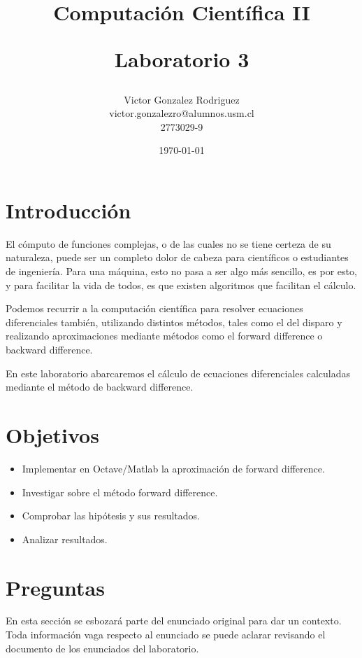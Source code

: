 \documentclass[12pt,letterpaper]{article}
\begin{document}
\title{Computación Científica II \\ \begin{Large}Laboratorio 3\end{Large}} 
\author{Victor Gonzalez Rodriguez\\victor.gonzalezro@alumnos.usm.cl\\2773029-9}
\date{\today}
\maketitle

\section{Introducción}
El cómputo de funciones complejas, o de las cuales no se tiene certeza de su naturaleza, puede ser un completo dolor de cabeza para científicos o estudiantes de ingeniería. Para una máquina, esto no pasa a ser algo más sencillo, es por esto, y para facilitar la vida de todos, es que existen algoritmos que facilitan el cálculo.

Podemos recurrir a la computación científica para resolver ecuaciones diferenciales también, utilizando distintos métodos, tales como el del disparo y realizando aproximaciones mediante métodos como el forward difference o backward difference.

En este laboratorio abarcaremos el cálculo de ecuaciones diferenciales calculadas mediante el método de backward difference.

\section{Objetivos}
\begin{itemize}
\item Implementar en Octave/Matlab la aproximación de forward difference.
\item Investigar sobre el método forward difference.
\item Comprobar las hipótesis y sus resultados.
\item Analizar resultados.
\end{itemize}

\section{Preguntas}
En esta sección se esbozará parte del enunciado original para dar un contexto. Toda información vaga respecto al enunciado se puede aclarar revisando el documento de los enunciados del laboratorio.
\end{document}
